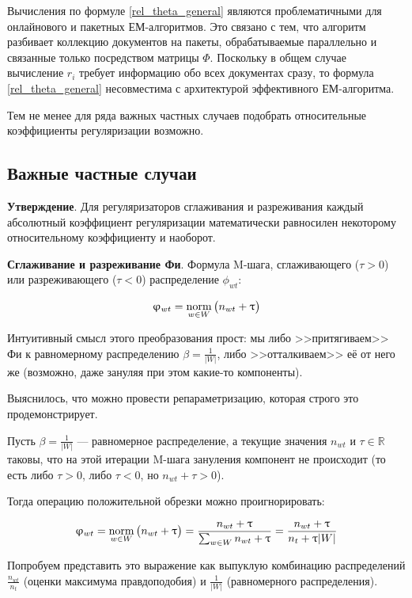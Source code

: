 Вычисления по формуле \ref{rel_theta_general} являются проблематичными для онлайнового и пакетных ЕМ-алгоритмов. Это связано с тем, что алгоритм разбивает коллекцию документов на пакеты, обрабатываемые параллельно и связанные только посредством матрицы $\Phi$. Поскольку в общем случае вычисление $r_i$ требует информацию обо всех документах сразу, то формула \ref{rel_theta_general} несовместима с архитектурой эффективного ЕМ-алгоритма.

Тем не менее для ряда важных частных случаев подобрать относительные коэффициенты регуляризации возможно.

\subsection{Важные частные случаи}


\textbf{Утверждение}. Для регуляризаторов сглаживания и разреживания каждый абсолютный коэффициент регуляризации математически равносилен некоторому относительному коэффициенту и наоборот.

\textbf{Сглаживание и разреживание Фи}. Формула M-шага, сглаживающего ($\tau > 0$) или разреживающего ($\tau < 0$) распределение $\phi_{wt}$:

\[
\upvarphi_{wt} = \mathop{\mathrm{norm}}\limits_{w \in W} \big( n_{wt} + \uptau \big)
\]

Интуитивный смысл этого преобразования прост: мы либо >>притягиваем>> Фи к равномерному распределению $\beta = \frac{1}{|W|}$, либо >>отталкиваем>> её от него же (возможно, даже зануляя при этом какие-то компоненты).

Выяснилось, что можно провести репараметризацию, которая строго это продемонстрирует.

Пусть $\beta = \frac{1}{|W|}$ --- равномерное распределение, а текущие значения $n_{wt}$ и $\tau \in \mathbb{R}$ таковы, что на этой итерации M-шага зануления компонент не происходит (то есть либо $\tau > 0$, либо $\tau < 0$, но $n_{wt} + \tau > 0$).

Тогда операцию положительной обрезки можно проигнорировать:

\[
\upvarphi_{wt} = \mathop{\mathrm{norm}}\limits_{w \in W} \big( n_{wt} + \uptau \big) = \frac{n_{wt} + \uptau }{\sum_{w \in W} n_{wt} + \uptau } = \frac{n_{wt} + \uptau }{n_{t} + \uptau |W|}
\]

Попробуем представить это выражение как выпуклую комбинацию распределений  $\frac{n_{wt}}{n_t}$ (оценки максимума правдоподобия) и $\frac{1}{|W|}$ (равномерного распределения).

